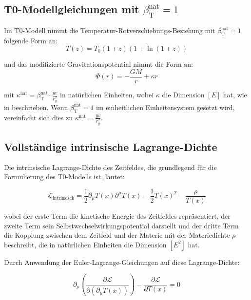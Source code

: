 \documentclass[12pt,a4paper]{article}
\newcommand{\Tfield}{T(x)}
\newcommand{\betaT}{\beta_{\text{T}}}
\begin{document}
	\subsection{T0-Modellgleichungen mit \(\betaT^{\text{nat}} = 1\)}
	\label{subsec:t0_equations}
	
	Im T0-Modell nimmt die Temperatur-Rotverschiebungs-Beziehung mit \(\betaT^{\text{nat}} = 1\) folgende Form an:
	\begin{equation}
		T(z) = T_0 (1+z)(1+\ln(1+z))
	\end{equation}
	
	und das modifizierte Gravitationspotential nimmt die Form an:
	\begin{equation}
		\Phi(r) = -\frac{G M}{r} + \kappa r
	\end{equation}
	
	mit \(\kappa^{\text{nat}} = \betaT^{\text{nat}} \cdot \frac{yv}{r_g^2}\) in natürlichen Einheiten, wobei \(\kappa\) die Dimension \([E]\) hat, wie in \cite{pascher_emergente_gravitation_2025} beschrieben. Wenn \(\betaT^{\text{nat}} = 1\) im einheitlichen Einheitensystem gesetzt wird, vereinfacht sich dies zu \(\kappa^{\text{nat}} = \frac{yv}{r_g^2}\).
	
	\subsection{Vollständige intrinsische Lagrange-Dichte}
	\label{subsec:intrinsic_lagrangian}
	
	Die intrinsische Lagrange-Dichte des Zeitfeldes, die grundlegend für die Formulierung des T0-Modells ist, lautet:
	
	\begin{equation}
		\mathcal{L}_{\text{intrinsisch}} = \frac{1}{2} \partial_\mu \Tfield \partial^\mu \Tfield - \frac{1}{2}\Tfield^2 - \frac{\rho}{\Tfield}
	\end{equation}
	
	wobei der erste Term die kinetische Energie des Zeitfeldes repräsentiert, der zweite Term sein Selbstwechselwirkungspotential darstellt und der dritte Term die Kopplung zwischen dem Zeitfeld und der Materie mit der Materiedichte $\rho$ beschreibt, die in natürlichen Einheiten die Dimension $[E^2]$ hat.
	
	Durch Anwendung der Euler-Lagrange-Gleichungen auf diese Lagrange-Dichte:
	
	\begin{equation}
		\partial_\mu \left( \frac{\partial \mathcal{L}}{\partial(\partial_\mu \Tfield)} \right) - \frac{\partial \mathcal{L}}{\partial \Tfield} = 0
	\end{equation}
	
\end{document}
